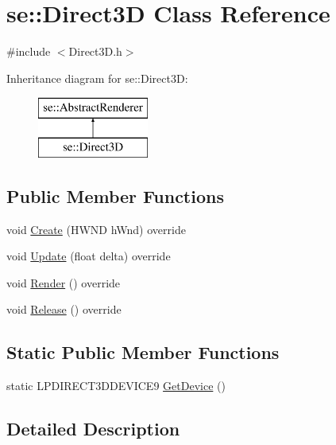 \hypertarget{classse_1_1_direct3_d}{}\section{se\+:\+:Direct3D Class Reference}
\label{classse_1_1_direct3_d}


{\ttfamily \#include $<$Direct3\+D.\+h$>$}

Inheritance diagram for se\+:\+:Direct3D\+:\begin{figure}[H]
\begin{center}
\leavevmode
\includegraphics[height=2.000000cm]{classse_1_1_direct3_d}
\end{center}
\end{figure}
\subsection*{Public Member Functions}
\begin{DoxyCompactItemize}
\item 
void \mbox{\hyperlink{classse_1_1_direct3_d_a316456762829db0614077cccd655e654}{Create}} (H\+W\+ND h\+Wnd) override
\item 
void \mbox{\hyperlink{classse_1_1_direct3_d_a39934c194406f108a992d82a4d265381}{Update}} (float delta) override
\item 
void \mbox{\hyperlink{classse_1_1_direct3_d_af4e167f88160d79fc66b4d65694b536a}{Render}} () override
\item 
void \mbox{\hyperlink{classse_1_1_direct3_d_ae2979f16a5c35773cf2c243d8e6f90e4}{Release}} () override
\end{DoxyCompactItemize}
\subsection*{Static Public Member Functions}
\begin{DoxyCompactItemize}
\item 
static L\+P\+D\+I\+R\+E\+C\+T3\+D\+D\+E\+V\+I\+C\+E9 \mbox{\hyperlink{classse_1_1_direct3_d_af37600089f9754a90e615210a6bee4f7}{Get\+Device}} ()
\end{DoxyCompactItemize}


\subsection{Detailed Description}


